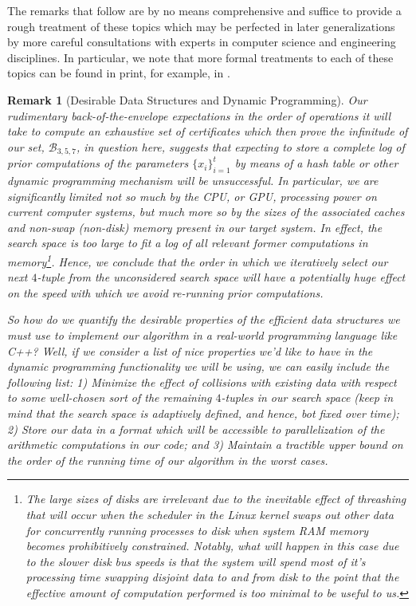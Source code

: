 \documentclass[12pt]{article}
\newtheorem{remark}[theorem]{Remark}
\begin{document}
The remarks that follow are by no means comprehensive and suffice to 
provide a rough treatment of these topics which may be perfected in later generalizations by 
more careful consultations with experts in computer science and engineering disciplines. 
In particular, we note that more formal treatments to each of these topics can be found in print, 
for example, in \cite{PARALLEL-COMPREF,TANENBAUM-OS}. 

\begin{remark}[Desirable Data Structures and Dynamic Programming] 
Our rudimentary back-of-the-envelope expectations in the order of operations it will take to compute an 
exhaustive set of certificates which then prove the infinitude of our set, $\mathcal{B}_{3,5,7}$, in question 
here, suggests that expecting to store a complete log of prior computations of the parameters 
$\{x_i\}_{i=1}^t$ by means of a hash table or other dynamic programming mechanism will be unsuccessful. 
In particular, we are significantly limited not so much by the CPU, or GPU, processing power on 
current computer systems, but much more so by the sizes of the associated caches and non-swap (non-disk) 
memory present in our target system. In effect, the search space is too large to fit a log of all 
relevant former computations in memory\footnote{ 
     The large sizes of disks are irrelevant due to the inevitable effect of 
     \emph{threashing} that will occur when the scheduler in the Linux kernel 
     swaps out other data for concurrently running processes to disk when system RAM memory becomes 
     prohibitively constrained. Notably, what will happen in this case due to the slower disk bus speeds 
     is that the system will spend most of it's processing time swapping disjoint data to and from disk 
     to the point that 
     the effective amount of computation performed is too minimal to be useful to us.
}. Hence, we conclude that the order in which we iteratively select our next $4$-tuple from the 
unconsidered search space will have a potentially huge effect on the speed with which we avoid re-running 
prior computations. 

\emph{So how do we quantify the desirable properties of the efficient data structures we must use to 
implement our algorithm in a real-world programming language like C++?} Well, if we consider a list of 
nice properties we'd like to have in the dynamic programming functionality we will be using, we can easily 
include the following list: 
1) Minimize the effect of collisions with existing data with respect to some well-chosen 
sort of the remaining $4$-tuples in our search space (keep in mind that the search space is adaptively 
defined, and hence, bot fixed over time); 
2) Store our data in a format which will be accessible to parallelization of the arithmetic 
computations in our code; and 
3) Maintain a tractible upper bound on the order of the running time of our algorithm in the worst cases. 
\end{remark} 
\end{document}
